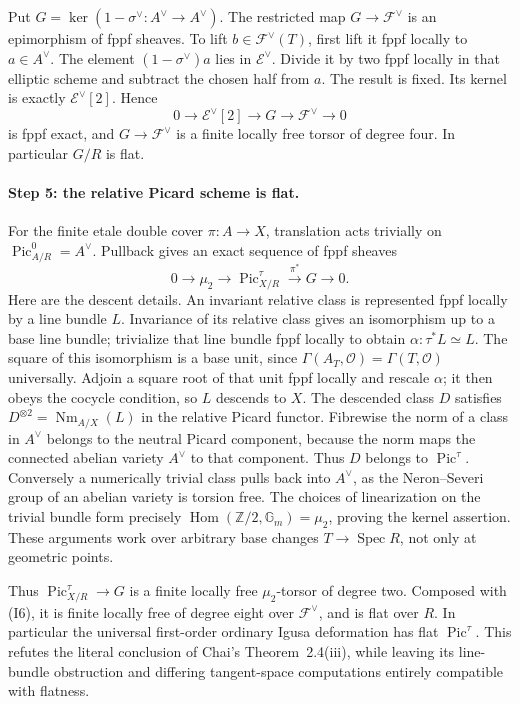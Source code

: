 Put $G=\ker(1-\sigma^\vee:A^\vee\to A^\vee)$.
The restricted map $G\to\mathcal F^\vee$ is an epimorphism of fppf
sheaves. To lift $b\in\mathcal F^\vee(T)$, first lift it fppf locally
to $a\in A^\vee$. The element $(1-\sigma^\vee)a$ lies in
$\mathcal E^\vee$. Divide it by two fppf locally in that elliptic
scheme and subtract the chosen half from $a$. The result is fixed.
Its kernel is exactly $\mathcal E^\vee[2]$. Hence
\[
 0\longrightarrow\mathcal E^\vee[2]\longrightarrow G
 \longrightarrow\mathcal F^\vee\longrightarrow0          \tag{I6}
\]
is fppf exact, and $G\to\mathcal F^\vee$ is a finite locally free
torsor of degree four. In particular $G/R$ is flat.

\paragraph{Step 5: the relative Picard scheme is flat.}
For the finite etale double cover $\pi:A\to X$, translation acts
trivially on $\operatorname{Pic}^0_{A/R}=A^\vee$. Pullback gives an
exact sequence of fppf sheaves
\[
 0\longrightarrow\mu_2\longrightarrow
 \operatorname{Pic}^{\tau}_{X/R}\stackrel{\pi^*}{\longrightarrow}
 G\longrightarrow0.                                    \tag{I7}
\]
Here are the descent details. An invariant relative class is represented
fppf locally by a line bundle $L$. Invariance of its relative class gives an isomorphism up to a base line bundle; trivialize that line bundle fppf locally to obtain
$\alpha:\tau^*L\simeq L$. The square of this isomorphism is a base
unit, since $\Gamma(A_T,\mathcal O)=\Gamma(T,\mathcal O)$ universally.
Adjoin a square root of that unit fppf locally and rescale $\alpha$;
it then obeys the cocycle condition, so $L$ descends to $X$.
The descended class $D$ satisfies
$D^{\otimes2}=\operatorname{Nm}_{A/X}(L)$ in the relative Picard
functor. Fibrewise the norm of a class in $A^\vee$ belongs to the
neutral Picard component, because the norm maps the connected
abelian variety $A^\vee$ to that component. Thus $D$ belongs to
$\operatorname{Pic}^{\tau}$.
Conversely a numerically trivial class pulls back into $A^\vee$, as
the Neron--Severi group of an abelian variety is torsion free.
The choices of linearization on the trivial bundle form precisely
$\operatorname{Hom}(\mathbb Z/2,\mathbb G_m)=\mu_2$, proving the
kernel assertion. These arguments work over arbitrary base changes
$T\to\operatorname{Spec}R$, not only at geometric points.

Thus $\operatorname{Pic}^{\tau}_{X/R}\to G$ is a finite locally free
$\mu_2$-torsor of degree two. Composed with (I6), it is finite locally
free of degree eight over $\mathcal F^\vee$, and is flat over $R$.
In particular the universal first-order ordinary Igusa deformation has
flat $\operatorname{Pic}^{\tau}$.
This refutes the literal conclusion of Chai's Theorem~2.4(iii),
while leaving its line-bundle obstruction and differing tangent-space
computations entirely compatible with flatness.

